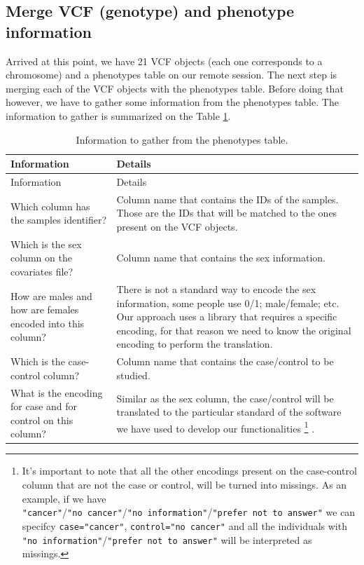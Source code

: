 \documentclass[
]{book}
\begin{document}
\hypertarget{vcf_merge}{%
\subsection{Merge VCF (genotype) and phenotype information}\label{vcf_merge}}

Arrived at this point, we have 21 VCF objects (each one corresponds to a chromosome) and a phenotypes table on our remote session. The next step is merging each of the VCF objects with the phenotypes table. Before doing that however, we have to gather some information from the phenotypes table. The information to gather is summarized on the Table \ref{tab:tab2}.

\begin{longtable}[]{@{}
  >{\raggedright\arraybackslash}p{}
  >{\raggedright\arraybackslash}p{}@{}}
\caption{\label{tab:tab2} Information to gather from the phenotypes table.}\tabularnewline
\toprule
Information & Details \\
\midrule
\endfirsthead
\toprule
Information & Details \\
\midrule
\endhead
Which column has the samples identifier? & Column name that contains the IDs of the samples. Those are the IDs that will be matched to the ones present on the VCF objects. \\
Which is the sex column on the covariates file? & Column name that contains the sex information. \\
How are males and how are females encoded into this column? & There is not a standard way to encode the sex information, some people use 0/1; male/female; etc. Our approach uses a library that requires a specific encoding, for that reason we need to know the original encoding to perform the translation. \\
Which is the case-control column? & Column name that contains the case/control to be studied. \\
What is the encoding for case and for control on this column? & Similar as the sex column, the case/control will be translated to the particular standard of the software we have used to develop our functionalities \footnote{It's important to note that all the other encodings present on the case-control column that are not the case or control, will be turned into missings. As an example, if we have \texttt{"cancer"}/\texttt{"no\ cancer"}/\texttt{"no\ information"}/\texttt{"prefer\ not\ to\ answer"} we can specifcy \texttt{case="cancer"}, \texttt{control="no\ cancer"} and all the individuals with \texttt{"no\ information"}/\texttt{"prefer\ not\ to\ answer"} will be interpreted as missings.} . \\
\bottomrule
\end{longtable}
\end{document}
